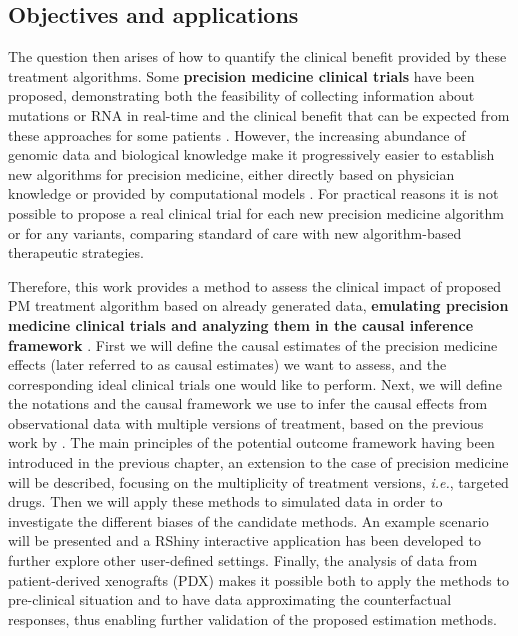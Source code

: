\documentclass[a4paper,12pt,twoside,onecolumn,openright,final,oldfontcommands]{memoir}
\begin{document}
\subsection{Objectives and
applications}\label{objectives-and-applications}

The question then arises of how to quantify the clinical benefit
provided by these treatment algorithms. Some \textbf{precision medicine
clinical trials} have been proposed, demonstrating both the feasibility
of collecting information about mutations \citep{le2015molecularly} or
RNA \citep{rodon2019genomic} in real-time and the clinical benefit that
can be expected from these approaches for some patients
\citep{coyne2017defining}. However, the increasing abundance of genomic
data and biological knowledge make it progressively easier to establish
new algorithms for precision medicine, either directly based on
physician knowledge or provided by computational models
\citep{hansen2013computation}. For practical reasons it is not possible
to propose a real clinical trial for each new precision medicine
algorithm or for any variants, comparing standard of care with new
algorithm-based therapeutic strategies.

Therefore, this work provides a method to assess the clinical impact of
proposed PM treatment algorithm based on already generated data,
\textbf{emulating precision medicine clinical trials and analyzing them
in the causal inference framework} \citep{hernan2016using}. First we
will define the causal estimates of the precision medicine effects
(later referred to as causal estimates) we want to assess, and the
corresponding ideal clinical trials one would like to perform. Next, we
will define the notations and the causal framework we use to infer the
causal effects from observational data with multiple versions of
treatment, based on the previous work by \citet{vanderweele2013causal}.
The main principles of the potential outcome framework having been
introduced in the previous chapter, an extension to the case of
precision medicine will be described, focusing on the multiplicity of
treatment versions, \emph{i.e.}, targeted drugs. Then we will apply
these methods to simulated data in order to investigate the different
biases of the candidate methods. An example scenario will be presented
and a RShiny interactive application has been developed to further
explore other user-defined settings. Finally, the analysis of data from
patient-derived xenografts (PDX) makes it possible both to apply the
methods to pre-clinical situation and to have data approximating the
counterfactual responses, thus enabling further validation of the
proposed estimation methods.
\end{document}
